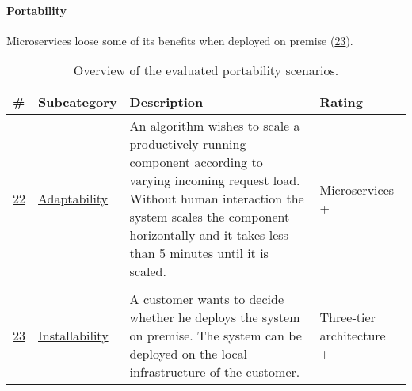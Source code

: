 \paragraph{Portability}
\begin{itemize}
\con Microservices loose some of its benefits when deployed on premise (\hyperref[quaMicro:s23]{23}).
\end{itemize}

\begin{table}[H]
  \renewcommand{\arraystretch}{1.2}
  \centering
  \sffamily
  \begin{footnotesize}
    \begin{tabular}{l l p{} p{}}
    \toprule
    \textbf{\#} & \textbf{Subcategory} & \textbf{Description}& \textbf{Rating} \\
    \midrule
       \hyperref[quaMicro:s22]{22} & \hyperref[quaMicro:s22]{Adaptability} & An algorithm wishes to scale a productively running component according to varying incoming request load. Without human interaction the system scales the component horizontally and it takes less than 5 minutes until it is scaled. & Microservices + \\  \\ 
       \hyperref[quaMicro:s23]{23} & \hyperref[quaMicro:s23]{Installability} & A customer wants to decide whether he deploys the system on premise. The system can be deployed on the local infrastructure of the customer. & Three-tier architecture + \\
   \bottomrule
    \end{tabular}
  \end{footnotesize}
  \rmfamily
  \caption[Overview of the evaluated portability scenarios.]{Overview of the evaluated portability scenarios.}
  \label{quaMicro:tableOverview}
\end{table}
